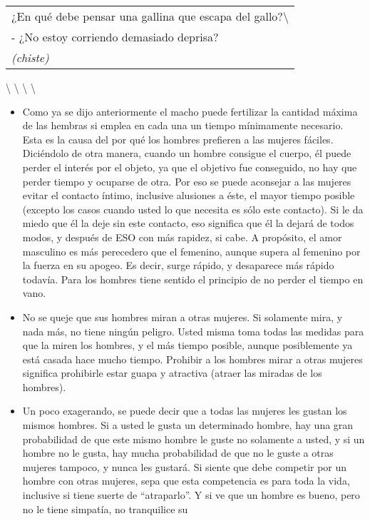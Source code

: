 \begin{longtable}[]{@{}l@{}}
\toprule
¿En qué debe pensar una gallina que escapa del
gallo?\textbackslash{}\tabularnewline
- ¿No estoy corriendo demasiado deprisa?\tabularnewline
\emph{(chiste)}\tabularnewline
\bottomrule
\end{longtable}

\textbackslash{} \textbackslash{} \textbackslash{} \textbackslash{}

\begin{itemize}
\item
  Como ya se dijo anteriormente el macho puede fertilizar la cantidad
  máxima de las hembras si emplea en cada una un tiempo mínimamente
  necesario. Esta es la causa del por qué los hombres prefieren a las
  mujeres fáciles. Diciéndolo de otra manera, cuando un hombre consigue
  el cuerpo, él puede perder el interés por el objeto, ya que el
  objetivo fue conseguido, no hay que perder tiempo y ocuparse de otra.
  Por eso se puede aconsejar a las mujeres evitar el contacto íntimo,
  inclusive alusiones a éste, el mayor tiempo posible (excepto los casos
  cuando usted lo que necesita es sólo este contacto). Si le da miedo
  que él la deje sin este contacto, eso significa que él la dejará de
  todos modos, y después de ESO con más rapidez, si cabe. A propósito,
  el amor masculino es más perecedero que el femenino, aunque supera al
  femenino por la fuerza en su apogeo. Es decir, surge rápido, y
  desaparece más rápido todavía. Para los hombres tiene sentido el
  principio de no perder el tiempo en vano.
\item
  No se queje que sus hombres miran a otras mujeres. Si solamente mira,
  y nada más, no tiene ningún peligro. Usted misma toma todas las
  medidas para que la miren los hombres, y el más tiempo posible, aunque
  posiblemente ya está casada hace mucho tiempo. Prohibir a los hombres
  mirar a otras mujeres significa prohibirle estar guapa y atractiva
  (atraer las miradas de los hombres).
\item
  Un poco exagerando, se puede decir que a todas las mujeres les gustan
  los mismos hombres. Si a usted le gusta un determinado hombre, hay una
  gran probabilidad de que este mismo hombre le guste no solamente a
  usted, y si un hombre no le gusta, hay mucha probabilidad de que no le
  guste a otras mujeres tampoco, y nunca les gustará. Si siente que debe
  competir por un hombre con otras mujeres, sepa que esta competencia es
  para toda la vida, inclusive si tiene suerte de ``atraparlo''. Y si ve
  que un hombre es bueno, pero no le tiene simpatía, no tranquilice su

\end{itemize}

